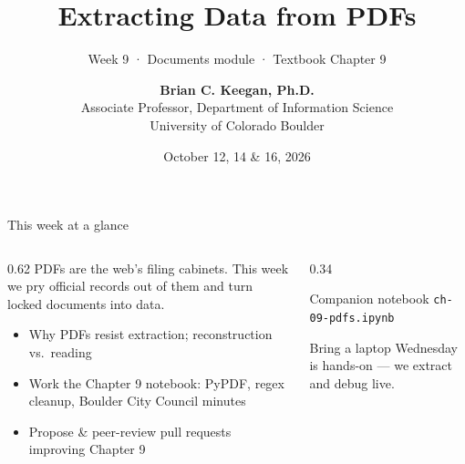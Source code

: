 \documentclass[9pt,aspectratio=169]{beamer}
\title[Week 9 · PDFs]{{\Huge Extracting Data from PDFs}}
\subtitle{Week 9 · Documents module · Textbook Chapter 9}
\author[Keegan]{\textbf{Brian C. Keegan, Ph.D.} \\ Associate Professor, Department of Information Science \\ University of Colorado Boulder}
\date{October 12, 14 \& 16, 2026}
\begin{document}
\maketitle

\begin{frame}{This week at a glance}
    \begin{columns}[T]
        \begin{column}{0.62\textwidth}
            PDFs are the web's filing cabinets. This week we pry official records out of them and turn locked documents into data.

            \vspace{1em}

            \begin{itemize}\small
                \item Why PDFs resist extraction; reconstruction vs.\ reading
            \end{itemize}

            \vspace{0.5em}

            \begin{itemize}\small
                \item Work the Chapter 9 notebook: PyPDF, regex cleanup, Boulder City Council minutes
            \end{itemize}

            \vspace{0.5em}

            \begin{itemize}\small
                \item Propose \& peer-review pull requests improving Chapter 9
            \end{itemize}
        \end{column}
        \begin{column}{0.34\textwidth}
            \begin{block}{Companion notebook}
                \footnotesize \texttt{ch-09-pdfs.ipynb}
            \end{block}
            \begin{alertblock}{Bring a laptop}
                \footnotesize Wednesday is hands-on --- we extract and debug live.
            \end{alertblock}
        \end{column}
    \end{columns}
\end{frame}
\end{document}
